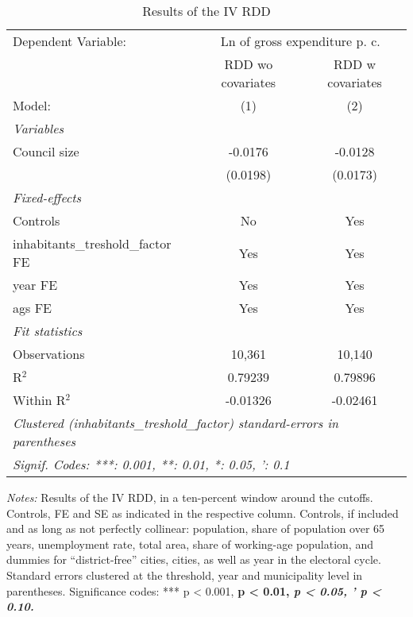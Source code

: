 
\begin{table}[htbp]
   \caption{\label{tab:rdd_iv} Results of the \ac{IV} \ac{RDD}}
   \centering
   \begin{tabular}{lcc}
      \tabularnewline \midrule \midrule
      Dependent Variable: & \multicolumn{2}{c}{Ln of gross expenditure p. c.}\\
                                               & \acs{RDD} \acs{wo} covariates   & \acs{RDD} \acs{w} covariates \\     
      Model:                                   & (1)                             & (2)\\  
      \midrule
      \emph{Variables}\\
      Council size                             & -0.0176                         & -0.0128\\   
                                               & (0.0198)                        & (0.0173)\\   
      \midrule
      \emph{Fixed-effects}\\
      Controls                                 & No                              & Yes\\  
      inhabitants\_treshold\_factor \ac{FE}    & Yes                             & Yes\\  
      year \ac{FE}                             & Yes                             & Yes\\  
      ags \ac{FE}                              & Yes                             & Yes\\  
      \midrule
      \emph{Fit statistics}\\
      Observations                             & 10,361                          & 10,140\\  
      R$^2$                                    & 0.79239                         & 0.79896\\  
      Within R$^2$                             & -0.01326                        & -0.02461\\  
      \midrule \midrule
      \multicolumn{3}{l}{\emph{Clustered (inhabitants\_treshold\_factor) standard-errors in parentheses}}\\
      \multicolumn{3}{l}{\emph{Signif. Codes: ***: 0.001, **: 0.01, *: 0.05, ': 0.1}}\\
   \end{tabular}
   
   \par \raggedright 
   \footnotesize{\textit{Notes:} Results of the \ac{IV} \ac{RDD}, in a ten-percent window around the cutoffs. Controls, \ac{FE} and \ac{SE} as indicated in the respective column. Controls, if included and as long as not perfectly collinear: population, share of population over 65 years, unemployment rate, total area, share of working-age population, and dummies for ``district-free'' cities, cities, as well as year in the electoral cycle. Standard errors clustered at the threshold, year and municipality level in parentheses. Significance codes: *** p < 0.001, \textbf{ p < 0.01, \textit{ p < 0.05, ' p < 0.10.}}}
\end{table}


